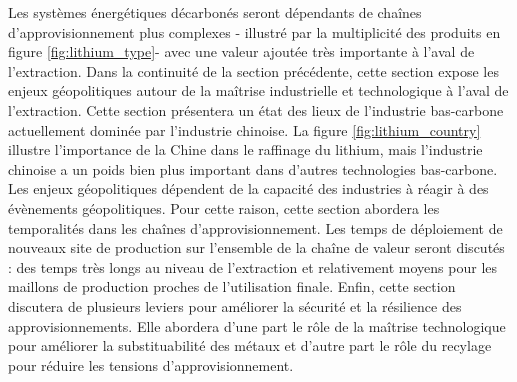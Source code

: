 Les systèmes énergétiques décarbonés seront dépendants de chaînes d'approvisionnement plus complexes - illustré par la multiplicité des produits en figure \ref{fig:lithium_type}- avec une valeur ajoutée très importante à l'aval de l'extraction. Dans la continuité de la section précédente, cette section expose les enjeux géopolitiques autour de la maîtrise industrielle et technologique à l'aval de l'extraction.\smallbreak
Cette section présentera un état des lieux de l'industrie bas-carbone actuellement dominée par l'industrie chinoise. La figure \ref{fig:lithium_country} illustre l'importance de la Chine dans le raffinage du lithium, mais l'industrie chinoise a un poids bien plus important dans d'autres technologies bas-carbone.\smallbreak
Les enjeux géopolitiques dépendent de la capacité des industries à réagir à des évènements géopolitiques. Pour cette raison, cette section abordera les temporalités dans les chaînes d'approvisionnement. Les temps de déploiement de nouveaux site de production sur l'ensemble de la chaîne de valeur seront discutés : des temps très longs au niveau de l'extraction et relativement moyens pour les maillons de production proches de l'utilisation finale.\smallbreak
Enfin, cette section discutera de plusieurs leviers pour améliorer la sécurité et la résilience des approvisionnements. Elle abordera d'une part le rôle de la maîtrise technologique pour améliorer la substituabilité des métaux et d'autre part le rôle du recylage pour réduire les tensions d'approvisionnement.
